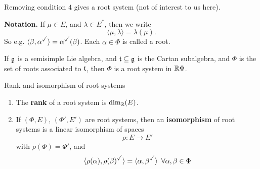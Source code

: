 \documentclass{article}
\begin{document}
\begin{remark*}
    Removing condition $4$ gives a  root system (not of interest to us here).
\end{remark*}
\textbf{Notation.} If $\mu \in E$, and $\lambda \in E^{*}$, then we write \[ \langle \mu, \lambda \rangle = \lambda(\mu).\] So e.g. $\langle \beta, \alpha^{\checked} \rangle = \alpha^{\checked}(\beta)$. Each $\alpha \in \Phi$ is called a root.
\begin{ex*} If $\mathfrak{g}$ is a semisimple Lie algebra, and $\mathfrak{t} \subseteq \mathfrak{g}$ is the Cartan subalgebra, and $\Phi$ is the set of roots associated to $\mathfrak{t}$, then $\Phi$ is a root system in $\mathbb{R} \Phi$.
\end{ex*}
\begin{fancydefine}{Rank and isomorphism of root systems} \hspace{0.1cm}
    \begin{enumerate}
        \item The \textbf{rank} of a root system is $\dim_{\mathbb{R}}(E)$.
        \item If $(\Phi, E)$, $(\Phi',E')$ are root systems, then an \textbf{isomorphism} of root systems is a linear isomorphism of spaces \[ \rho: E \to E' \] with $\rho(\Phi) = \Phi'$, and \[ \langle \rho(\alpha), \rho(\beta)^{\checked} \rangle = \langle \alpha, \beta^{\checked} \rangle \, \, \, \forall \alpha, \beta \in \Phi \]
    \end{enumerate}
\end{fancydefine}
\end{document}
